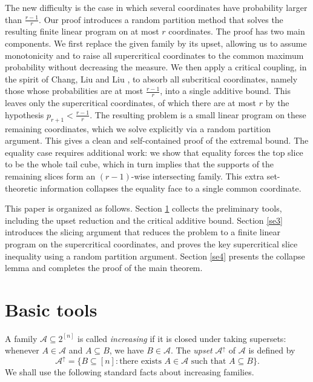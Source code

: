 \documentclass[11pt]{article}
\begin{document}
The new difficulty is the case in which several coordinates have probability larger than $\frac{r-1}{r}$. 
Our proof introduces a random partition method that solves the resulting finite linear program on at most $r$ coordinates. The proof has two main components. We first replace the given family by its upset, allowing us to assume monotonicity and to raise all supercritical coordinates to the common maximum probability without decreasing the measure. We then apply a critical coupling, in the spirit of Chang, Liu and Liu \cite{C26}, to absorb all subcritical coordinates, namely those whose probabilities are at most $\frac{r-1}{r}$, into a single additive bound. This leaves only the supercritical coordinates, of which there are at most $r$ by the hypothesis $p_{r+1}<\frac{r-1}{r}$. The resulting problem is a small linear program on these remaining coordinates, which we solve explicitly via a random partition argument. This gives a clean and self-contained proof of the extremal bound. The equality case requires additional work: we show that equality forces the top slice to be the whole tail cube, which in turn implies that the supports of the remaining slices form an $(r-1)$-wise intersecting family. This extra set-theoretic information collapses the equality face to a single common coordinate.



This paper is organized as follows. Section \ref{se2} collects the preliminary tools, including the upset reduction and the critical additive bound. Section \ref{se3} introduces the slicing argument that reduces the problem to a finite linear program on the supercritical coordinates, and proves the key supercritical slice inequality using a random partition argument. Section  \ref{se4} presents the collapse lemma and completes the proof of the main theorem.



\section{Basic tools}\label{se2}

 A family $\mathcal{A}\subseteq 2^{[n]}$ is called \textit{increasing} if it is closed under taking supersets: whenever $A\in\mathcal A$ and $A\subseteq B$, we have $B\in\mathcal{A}$. The \textit{upset} $\mathcal A^\uparrow$ of $\mathcal{A}$ is  defined by
$$
\mathcal{A}^\uparrow=\{B\subseteq[n]:\text{there exists }A\in\mathcal{A}\text{ such that }A\subseteq B\}.
$$
We shall use the following standard facts about increasing families.
\end{document}
